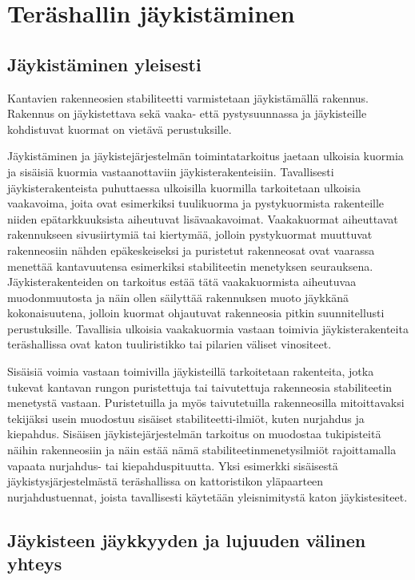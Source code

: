 \documentclass[12pt]{article}
\newenvironment{content}{\pagenumbering{arabic}}{}
\begin{document}
\begin{content}
\section{Teräshallin jäykistäminen}

\subsection{Jäykistäminen yleisesti}

Kantavien rakenneosien stabiliteetti varmistetaan jäykistämällä rakennus. Rakennus on jäykistettava sekä vaaka- että pystysuunnassa ja jäykisteille kohdistuvat kuormat on vietävä perustuksille. 

Jäykistäminen ja jäykistejärjestelmän toimintatarkoitus jaetaan ulkoisia kuormia ja sisäisiä kuormia vastaanottaviin jäykisterakenteisiin. Tavallisesti jäykisterakenteista puhuttaessa ulkoisilla kuormilla tarkoitetaan ulkoisia vaakavoima, joita ovat esimerkiksi tuulikuorma ja pystykuormista rakenteille niiden epätarkkuuksista aiheutuvat lisävaakavoimat. Vaakakuormat aiheuttavat rakennukseen sivusiirtymiä tai kiertymää, jolloin pystykuormat muuttuvat rakenneosiin nähden epäkeskeiseksi ja puristetut rakenneosat ovat vaarassa menettää kantavuutensa esimerkiksi stabiliteetin menetyksen seurauksena. Jäykisterakenteiden on tarkoitus estää tätä vaakakuormista aiheutuvaa muodonmuutosta ja näin ollen säilyttää rakennuksen muoto jäykkänä kokonaisuutena, jolloin kuormat ohjautuvat rakenneosia pitkin suunnitellusti perustuksille. Tavallisia ulkoisia vaakakuormia vastaan toimivia jäykisterakenteita teräshallissa ovat katon tuuliristikko tai pilarien väliset vinositeet. 

Sisäisiä voimia vastaan toimivilla jäykisteillä tarkoitetaan rakenteita, jotka tukevat kantavan rungon puristettuja tai taivutettuja rakenneosia stabiliteetin menetystä vastaan. Puristetuilla ja myös taivutetuilla rakenneosilla mitoittavaksi tekijäksi usein muodostuu sisäiset stabiliteetti-ilmiöt, kuten nurjahdus ja kiepahdus. Sisäisen jäykistejärjestelmän tarkoitus on muodostaa tukipisteitä näihin rakenneosiin ja näin estää nämä stabiliteetinmenetysilmiöt rajoittamalla vapaata nurjahdus- tai kiepahduspituutta. Yksi esimerkki sisäisestä jäykistysjärjestelmästä teräshallissa on kattoristikon yläpaarteen nurjahdustuennat, joista tavallisesti käytetään yleisnimitystä katon jäykistesiteet. 



\subsection{Jäykisteen jäykkyyden ja lujuuden välinen yhteys}


\end{content}
\end{document}
